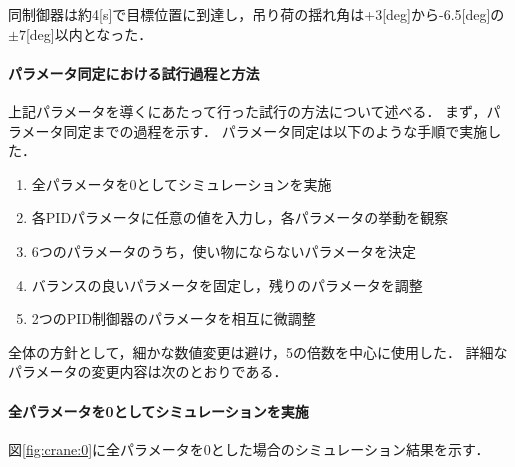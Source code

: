 \documentclass[dvipdfmx,titlepage,a4j]{jsarticle}  %
\begin{document}
同制御器は約4[s]で目標位置に到達し，吊り荷の揺れ角は+3[deg]から-6.5[deg]の$\pm 7$[deg]以内となった．

\paragraph{パラメータ同定における試行過程と方法\\}
上記パラメータを導くにあたって行った試行の方法について述べる．
まず，パラメータ同定までの過程を示す．
パラメータ同定は以下のような手順で実施した．

\begin{enumerate}
  \item 全パラメータを0としてシミュレーションを実施
  \item 各PIDパラメータに任意の値を入力し，各パラメータの挙動を観察
  \item 6つのパラメータのうち，使い物にならないパラメータを決定
  \item バランスの良いパラメータを固定し，残りのパラメータを調整
  \item 2つのPID制御器のパラメータを相互に微調整
\end{enumerate}

全体の方針として，細かな数値変更は避け，5の倍数を中心に使用した．
詳細なパラメータの変更内容は次のとおりである．

\paragraph{全パラメータを0としてシミュレーションを実施\\}
図\ref{fig:crane:0}に全パラメータを0とした場合のシミュレーション結果を示す．
\end{document}
